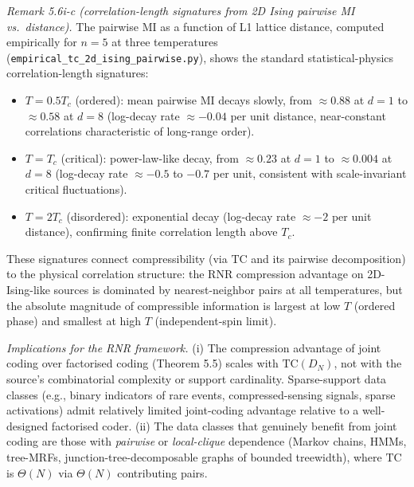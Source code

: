 \documentclass[
]{article}
\begin{document}
\emph{Remark 5.6i-c (correlation-length signatures from 2D Ising
pairwise MI vs.\ distance).} The pairwise MI as a function of L1
lattice distance, computed empirically for $n = 5$ at three
temperatures (\texttt{empirical\_tc\_2d\_ising\_pairwise.py}), shows
the standard statistical-physics correlation-length signatures:
\begin{itemize}
\item $T = 0.5 T_c$ (ordered): mean pairwise MI decays slowly,
from $\approx 0.88$ at $d = 1$ to $\approx 0.58$ at $d = 8$
(log-decay rate $\approx -0.04$ per unit distance, near-constant
correlations characteristic of long-range order).
\item $T = T_c$ (critical): power-law-like decay, from $\approx
0.23$ at $d = 1$ to $\approx 0.004$ at $d = 8$ (log-decay rate
$\approx -0.5$ to $-0.7$ per unit, consistent with scale-invariant
critical fluctuations).
\item $T = 2 T_c$ (disordered): exponential decay (log-decay rate
$\approx -2$ per unit distance), confirming finite correlation
length above $T_c$.
\end{itemize}
These signatures connect compressibility (via $\mathrm{TC}$ and its
pairwise decomposition) to the physical correlation structure: the
RNR compression advantage on 2D-Ising-like sources is dominated by
nearest-neighbor pairs at all temperatures, but the absolute
magnitude of compressible information is largest at low $T$
(ordered phase) and smallest at high $T$ (independent-spin limit).

\emph{Implications for the RNR framework.} (i) The compression
advantage of joint coding over factorised coding (Theorem 5.5)
scales with $\mathrm{TC}(D_N)$, not with the source's combinatorial
complexity or support cardinality. Sparse-support data classes
(e.g., binary indicators of rare events, compressed-sensing signals,
sparse activations) admit relatively limited joint-coding advantage
relative to a well-designed factorised coder. (ii) The data classes
that genuinely benefit from joint coding are those with
\emph{pairwise} or \emph{local-clique} dependence (Markov chains,
HMMs, tree-MRFs, junction-tree-decomposable graphs of bounded
treewidth), where $\mathrm{TC}$ is $\Theta(N)$ via $\Theta(N)$
contributing pairs.
\end{document}
